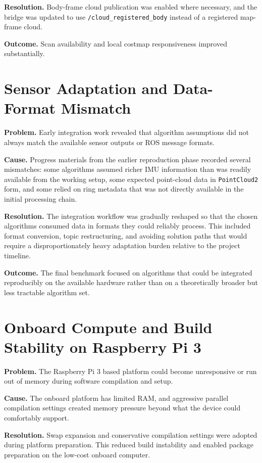 \documentclass[12pt,a4paper]{report}
\begin{document}
\textbf{Resolution.} Body-frame cloud publication was enabled where necessary, and the bridge was updated to use \texttt{/cloud\_registered\_body} instead of a registered map-frame cloud.

\textbf{Outcome.} Scan availability and local costmap responsiveness improved substantially.

\section{Sensor Adaptation and Data-Format Mismatch}
\textbf{Problem.} Early integration work revealed that algorithm assumptions did not always match the available sensor outputs or ROS message formats.

\textbf{Cause.} Progress materials from the earlier reproduction phase recorded several mismatches: some algorithms assumed richer IMU information than was readily available from the working setup, some expected point-cloud data in \texttt{PointCloud2} form, and some relied on ring metadata that was not directly available in the initial processing chain.

\textbf{Resolution.} The integration workflow was gradually reshaped so that the chosen algorithms consumed data in formats they could reliably process. This included format conversion, topic restructuring, and avoiding solution paths that would require a disproportionately heavy adaptation burden relative to the project timeline.

\textbf{Outcome.} The final benchmark focused on algorithms that could be integrated reproducibly on the available hardware rather than on a theoretically broader but less tractable algorithm set.

\section{Onboard Compute and Build Stability on Raspberry Pi 3}
\textbf{Problem.} The Raspberry Pi 3 based platform could become unresponsive or run out of memory during software compilation and setup.

\textbf{Cause.} The onboard platform has limited RAM, and aggressive parallel compilation settings created memory pressure beyond what the device could comfortably support.

\textbf{Resolution.} Swap expansion and conservative compilation settings were adopted during platform preparation. This reduced build instability and enabled package preparation on the low-cost onboard computer.
\end{document}
